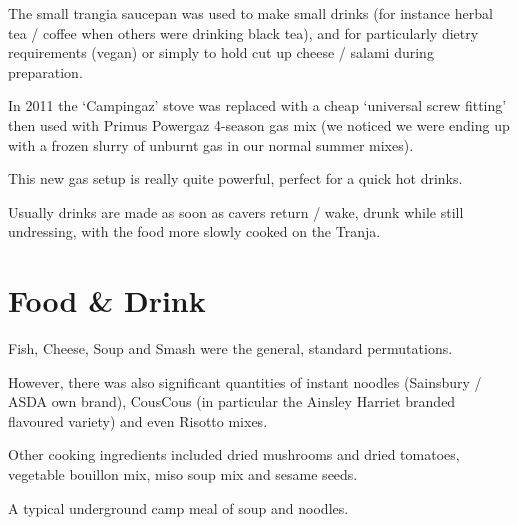 The small trangia saucepan was used to make small drinks (for instance herbal tea / coffee when others were drinking black tea), and for particularly dietry requirements (vegan) or simply to hold cut up cheese / salami during preparation.

In 2011 the `Campingaz' stove was replaced with a cheap `universal screw fitting' then used with Primus Powergaz 4-season gas mix (we noticed we were ending up with a frozen slurry of unburnt gas in our normal summer mixes).

This new gas setup is really quite powerful, perfect for a quick hot drinks.

Usually drinks are made as soon as cavers return / wake, drunk while still undressing, with the food more slowly cooked on the Tranja.


\section{Food \& Drink}

Fish, Cheese, Soup and Smash were the general, standard permutations.

However, there was also significant quantities of instant noodles (Sainsbury / ASDA own brand), CousCous (in particular the Ainsley Harriet branded flavoured variety) and even Risotto mixes.

Other cooking ingredients included dried mushrooms and dried tomatoes, vegetable bouillon mix, miso soup mix and sesame seeds.

\begin{marginfigure}
\checkoddpage \ifoddpage \forcerectofloat \else \forceversofloat \fi
\centering
 \caption{A typical underground camp meal of soup and noodles. }
 \label{soup noodles}
\end{marginfigure}


